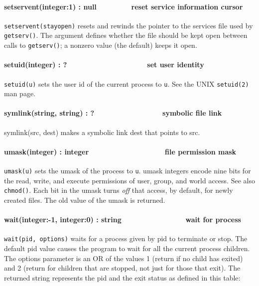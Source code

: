 \paragraph[setservent(integer:1) : null \ \ \ \ \ \  \ \ reset service
information cursor]{setservent(integer:1) : null \ \ \ \ \ \  \ \ reset
service information cursor}
\texttt{setservent(stayopen)} resets and rewinds the pointer to the
services file used by \texttt{getserv()}. The argument defines whether
the file should be kept open between calls to \texttt{getserv()}; a
nonzero value (the default) keeps it open. 

\paragraph[setuid(integer) : ?\ \ \ \ \ \ \ \ \ \ \ \ \ \ 
\ \ \ \ \ \ set user identity]{setuid(integer) :
?\ \ \ \ \ \ \ \ \ \ \ \ \ \  \ \ \ \ \ \ set user identity}
\texttt{setuid(u)} sets the user id of the current process to
\texttt{u}. See the UNIX \texttt{setuid(2)} man page. 

\paragraph[symlink(string, string) : ?\ \ \ \ \ \ \ \ \ \ \ \ 
\ \ \ \ \ symbolic file link]{symlink(string, string) :
?\ \ \ \ \ \ \ \ \ \ \ \  \ \ \ \ \ symbolic file link}
\index{link!symbolic file}symlink(src, dest) makes a symbolic link dest
that points to src.

\paragraph[umask(integer) : integer\ \ \ \ \ \ \ \ \ \ 
\ \ \ \ \ \ \ \ \ file permission mask]{umask(integer) :
integer\ \ \ \ \ \ \ \ \ \  \ \ \ \ \ \ \ \ \ file permission mask}
\texttt{umask(u)} sets the umask of the process to \texttt{u}. umask integers
encode nine bits for the read, write, and execute permissions of user,
group, and world access. See also \texttt{chmod()}. Each bit in the umask turns
\textit{off} that access, by default, for newly created files. The old
value of the umask is returned.

\paragraph[wait(integer:{}-1, integer:0) : string\ \ \ \ \ \ \ \ \ \ 
\ \ \ \ \ \ wait for process]{wait(integer:-1, integer:0) :
string\ \ \ \ \ \ \ \ \ \  \ \ \ \ \ \ wait for process}
\texttt{wait(pid, options)} waits for a process given by pid to terminate or
stop. The default pid value causes the program to wait for all the
current process{\textquotesingle} children. The options parameter is an
OR of the values 1 (return if no child has exited) and 2 (return for
children that are stopped, not just for those that exit). The returned
string represents the pid and the exit status as defined in this table:


